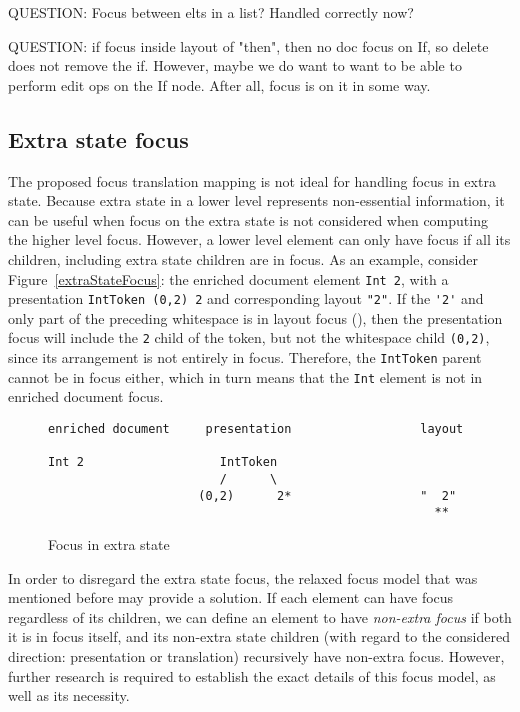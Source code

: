 QUESTION: Focus between elts in a list? Handled correctly now?
 
 
QUESTION: if focus inside layout of "then", then no doc focus on If, so delete does not remove the if. However, maybe we do want to want to be able to perform edit ops on the If node. After all, focus is on it in some way.


%																
\subsection{Extra state focus}

The proposed focus translation mapping is not ideal for handling focus in extra state. Because extra state in a lower level represents non-essential information, it can be useful when focus on the extra state is not considered when computing the higher level focus. However, a lower level element can only have focus if all its children, including extra state children are in focus. As an example, consider Figure~\ref{extraStateFocus}: the enriched document element \verb|Int 2|, with a presentation \verb|IntToken (0,2) 2| and corresponding layout \verb|"|\textvisiblespace\textvisiblespace\verb|2"|. If the \verb|'2'| and only part of the preceding whitespace is in layout focus ({\tt \textvisiblespace{}}), then the presentation focus will include the \verb|2| child of the token, but not the whitespace child \verb|(0,2)|, since its arrangement is not entirely in focus. Therefore, the \verb|IntToken| parent cannot be in focus either, which in turn means that the \verb|Int| element is not in enriched document focus. 

\begin{figure}
\begin{small}
\begin{center}
\begin{verbatim}
enriched document     presentation                  layout

Int 2                   IntToken        
                        /      \           
                     (0,2)      2*                  "  2"
                                                      **
\end{verbatim}
\caption{Focus in extra state}\label{extraStateFocusunpresentableFocus} 
\end{center}
\end{small}
\end{figure}

In order to disregard the extra state focus, the relaxed focus model that was mentioned before may provide a solution. If each element can have focus regardless of its children, we can define an element to have {\em non-extra focus} if both it is in focus itself, and its non-extra state children (with regard to the considered direction: presentation or translation) recursively have non-extra focus. However, further research is required to establish the exact details of this focus model, as well as its necessity.


